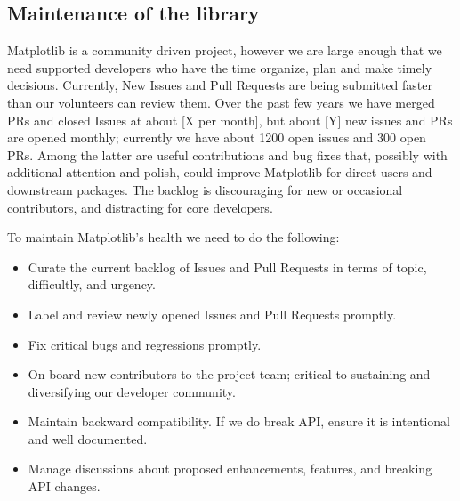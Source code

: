 \documentclass[11pt]{article}  %
\begin{document}
\subsection{Maintenance of the library}


Matplotlib is a community driven project, however we are large enough
that we need supported developers who have the time organize, plan and
make timely decisions.  Currently, New Issues and Pull Requests are
being submitted faster than our volunteers can review them.  Over the
past few years we have merged PRs and closed Issues at about [X per
  month], but about [Y] new issues and PRs are opened monthly;
currently we have about 1200 open issues and 300 open PRs.  Among the
latter are useful contributions and bug fixes that, possibly with
additional attention and polish, could improve Matplotlib for direct
users and downstream packages.  The backlog is discouraging for new or
occasional contributors, and distracting for core developers.

To maintain Matplotlib's health we need to do the following:

\begin{itemize}[noitemsep]
\item Curate the current backlog of Issues and Pull Requests
  in terms of topic, difficultly, and urgency.
\item Label and review newly opened Issues and Pull Requests
  promptly.
\item Fix critical bugs and regressions promptly.
\item On-board new contributors to the project team; critical to
  sustaining and diversifying our developer community.
\item Maintain backward compatibility.  If we do break API, ensure it
  is intentional and well documented.
\item Manage discussions about proposed enhancements, features, and
  breaking API changes.
\end{itemize}
\end{document}
